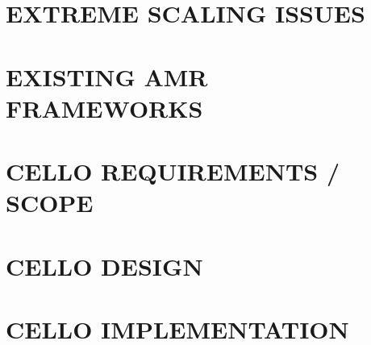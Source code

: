 \documentclass[14pt]{article}
\begin{document}
\section{EXTREME SCALING ISSUES} \label{s:issues}


\section{EXISTING AMR FRAMEWORKS} \label{s:review}

\section{CELLO REQUIREMENTS / SCOPE} \label{s:requirements}


\section{CELLO DESIGN} \label{s:design}

\section{CELLO IMPLEMENTATION} \label{s:implementation}
\end{document}
